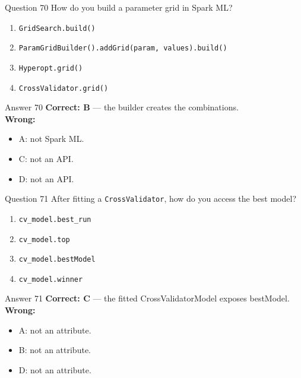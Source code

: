 \documentclass[aspectratio=169,11pt]{beamer}
\begin{document}
\begin{frame}{Question 70}
How do you build a parameter grid in Spark ML?
\begin{enumerate}[label=\Alph*.]
\item \texttt{GridSearch.build()}
\item \texttt{ParamGridBuilder().addGrid(param, values).build()}
\item \texttt{Hyperopt.grid()}
\item \texttt{CrossValidator.grid()}
\end{enumerate}
\end{frame}
\begin{frame}{Answer 70}
\textbf{Correct: B} --- the builder creates the combinations.\\
\vspace{0.5em}
\textbf{Wrong:}
\begin{itemize}
\item A: not Spark ML.
\item C: not an API.
\item D: not an API.
\end{itemize}
\end{frame}

\begin{frame}{Question 71}
After fitting a \texttt{CrossValidator}, how do you access the best model?
\begin{enumerate}[label=\Alph*.]
\item \texttt{cv\_model.best\_run}
\item \texttt{cv\_model.top}
\item \texttt{cv\_model.bestModel}
\item \texttt{cv\_model.winner}
\end{enumerate}
\end{frame}
\begin{frame}{Answer 71}
\textbf{Correct: C} --- the fitted CrossValidatorModel exposes bestModel.\\
\vspace{0.5em}
\textbf{Wrong:}
\begin{itemize}
\item A: not an attribute.
\item B: not an attribute.
\item D: not an attribute.
\end{itemize}
\end{frame}
\end{document}
